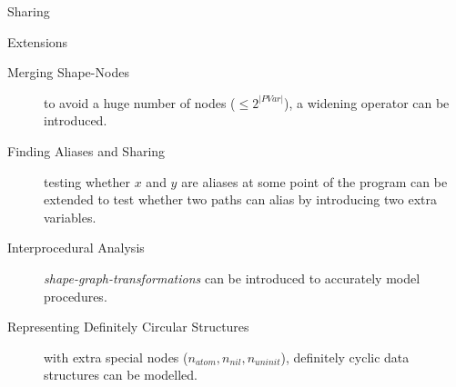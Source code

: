 \documentclass[xcolor={usenames,dvipsnames}]{beamer}
\begin{document}
\begin{frame}[fragile]{Sharing}
{\begin{center}
  \end{center}
  }
\end{frame}

\begin{frame}[fragile]{Extensions}
  \begin{description}
  \item[Merging Shape-Nodes] to avoid a huge number of nodes ($\leq 2^{|PVar|}$), a widening operator can be introduced.
  \item[Finding Aliases and Sharing] testing whether $x$ and $y$ are aliases at some point of the program can be extended to test whether two paths can alias by introducing two extra variables.
  \item[Interprocedural Analysis] \textit{shape-graph-transformations} can be introduced to accurately model procedures.
  \item[Representing Definitely Circular Structures] with extra special nodes ($n_{atom}, n_{nil}, n_{uninit}$), definitely cyclic data structures can be modelled.
  \end{description}
\end{frame}
\end{document}
